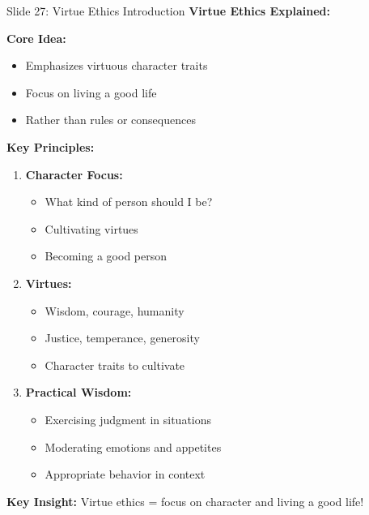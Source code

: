 \documentclass[8pt]{beamer}
\begin{document}
	\begin{frame}{Slide 27: Virtue Ethics Introduction}
		\fontsize{6.5}{7.5}\selectfont
		\textbf{Virtue Ethics Explained:}
		
		\vspace{0.1cm}
		\textbf{Core Idea:}
		\begin{itemize}
			\item Emphasizes virtuous character traits
			\item Focus on living a good life
			\item Rather than rules or consequences
		\end{itemize}
		
		\vspace{0.1cm}
		\textbf{Key Principles:}
		\begin{enumerate}
			\item \textbf{Character Focus:}
			\begin{itemize}
				\item What kind of person should I be?
				\item Cultivating virtues
				\item Becoming a good person
			\end{itemize}
			\item \textbf{Virtues:}
			\begin{itemize}
				\item Wisdom, courage, humanity
				\item Justice, temperance, generosity
				\item Character traits to cultivate
			\end{itemize}
			\item \textbf{Practical Wisdom:}
			\begin{itemize}
				\item Exercising judgment in situations
				\item Moderating emotions and appetites
				\item Appropriate behavior in context
			\end{itemize}
		\end{enumerate}
		
		\textcolor{myblue}{\textbf{Key Insight:}} Virtue ethics = \textcolor{myblue}{focus on character and living a good life}!
	\end{frame}
	
\end{document}
